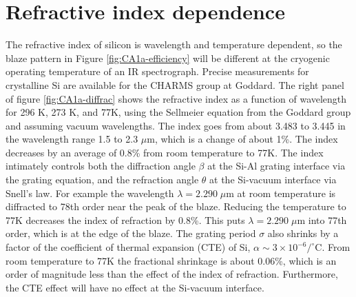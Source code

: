 \section{Refractive index dependence}
The refractive index of silicon is wavelength and temperature dependent, so the blaze pattern in Figure \ref{fig:CA1a-efficiency} will be different at the cryogenic operating temperature of an IR spectrograph.  Precise measurements for crystalline Si are available for the CHARMS group at Goddard\cite{frey2006}.  The right panel of figure \ref{fig:CA1a-diffrac} shows the refractive index as a function of wavelength for 296 K, 273 K, and 77K, using the Sellmeier equation from the Goddard group and assuming vacuum wavelengths.  The index goes from about 3.483 to 3.445 in the wavelength range 1.5 to 2.3 $\mu$m, which is a change of about 1\%.  The index decreases by an average of 0.8\% from room temperature to 77K.  The index intimately controls both the diffraction angle $\beta$ at the Si-Al grating interface via the grating equation, and the refraction angle $\theta$ at the Si-vacuum interface via Snell's law.  For example the wavelength $\lambda=2.290 \;\mu$m at room temperature is diffracted to 78th order near the peak of the blaze.  Reducing the temperature to 77K decreases the index of refraction by 0.8\%. This puts $\lambda= 2.290 \;\mu $m into 77th order, which is at the edge of the blaze.  The grating period $\sigma$ also shrinks by a factor of the coefficient of thermal expansion (CTE) of Si, $\alpha \sim 3\times10^{-6}/^\circ$C.  From room temperature to 77K the fractional shrinkage is about 0.06\%, which is an order of magnitude less than the effect of the index of refraction.  Furthermore, the CTE effect will have no effect at the Si-vacuum interface.

